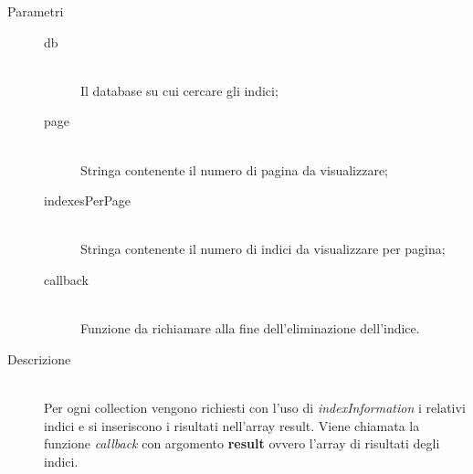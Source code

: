 \begin{description}
\begin{mldescription}
       \begin{description}
   	 \item[Parametri] \hfill
   	  \begin{description}
   	   \item[db] \hfill \\
   	   Il database su cui cercare gli indici;
   	   \item[page] \hfill \\
   	   Stringa contenente il numero di pagina da visualizzare;
   	   \item[indexesPerPage] \hfill \\
   	   Stringa contenente il numero di indici da visualizzare per pagina;
   	   \item[callback] \hfill \\
   	   Funzione da richiamare alla fine dell'eliminazione dell'indice.
   	  \end{description}
   	 \item[Descrizione] \hfill \\
   	 Per ogni collection vengono richiesti con l'uso di \textit{indexInformation} i relativi indici e si inseriscono i risultati nell'array result. Viene chiamata la funzione \textit{callback} con argomento \textbf{result} ovvero l'array di risultati degli indici.  	 
   	\end{description} 	    
    

\end{mldescription}
\end{description}

